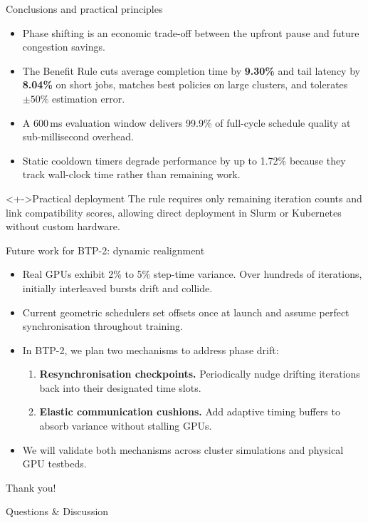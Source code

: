 \documentclass[aspectratio=169,11pt,c]{beamer}
\begin{document}
\begin{frame}{Conclusions and practical principles}
  \begin{itemize}[<+->]
    \item Phase shifting is an \alert{economic trade-off} between the upfront pause and future congestion savings.
    \item The Benefit Rule cuts average completion time by \textbf{9.30\%} and tail latency by \textbf{8.04\%} on short jobs, matches best policies on large clusters, and tolerates $\pm50\%$ estimation error.
    \item A 600\,ms evaluation window delivers 99.9\% of full-cycle schedule quality at sub-millisecond overhead.
    \item Static cooldown timers degrade performance by up to 1.72\% because they track wall-clock time rather than remaining work.
  \end{itemize}
  \vspace{-0.3em}
  \begin{block}<+->{Practical deployment}
    The rule requires only remaining iteration counts and link compatibility scores, allowing direct deployment in Slurm or Kubernetes without custom hardware.
  \end{block}
\end{frame}

\begin{frame}{Future work for BTP-2: dynamic realignment}
  \begin{itemize}[<+->]
    \item Real GPUs exhibit 2\% to 5\% step-time variance. Over hundreds of iterations, initially interleaved bursts drift and collide.
    \item Current geometric schedulers set offsets once at launch and assume perfect synchronisation throughout training.
    \item In BTP-2, we plan two mechanisms to address phase drift:
    \begin{enumerate}[<+->]
      \item \textbf{Resynchronisation checkpoints.} Periodically nudge drifting iterations back into their designated time slots.
      \item \textbf{Elastic communication cushions.} Add adaptive timing buffers to absorb variance without stalling GPUs.
    \end{enumerate}
    \item We will validate both mechanisms across cluster simulations and physical GPU testbeds.
  \end{itemize}
\end{frame}

\begin{frame}[standout]
  \fontsize{44}{50}\selectfont Thank you!\par
  \vspace{0.8em}
  \huge Questions \& Discussion
\end{frame}
\end{document}
